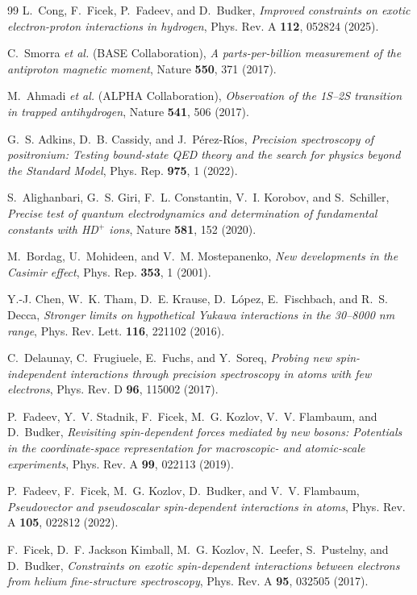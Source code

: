 \documentclass[
  aps,
  prd,
  reprint,
  amsmath,
  amssymb,
  nofootinbib,
  superscriptaddress,
  floatfix
]{revtex4-2}
\begin{document}
\begin{thebibliography}{99}
L.~Cong, F.~Ficek, P.~Fadeev, and D.~Budker,
\textit{Improved constraints on exotic electron-proton interactions in
hydrogen},
Phys. Rev. A \textbf{112}, 052824 (2025).

C.~Smorra \textit{et al.} (BASE Collaboration),
\textit{A parts-per-billion measurement of the antiproton magnetic
moment},
Nature \textbf{550}, 371 (2017).

M.~Ahmadi \textit{et al.} (ALPHA Collaboration),
\textit{Observation of the 1S--2S transition in trapped antihydrogen},
Nature \textbf{541}, 506 (2017).

G.~S. Adkins, D.~B. Cassidy, and J.~Pérez-Ríos,
\textit{Precision spectroscopy of positronium: Testing bound-state QED
theory and the search for physics beyond the Standard Model},
Phys. Rep. \textbf{975}, 1 (2022).

S.~Alighanbari, G.~S. Giri, F.~L. Constantin, V.~I. Korobov, and
S.~Schiller,
\textit{Precise test of quantum electrodynamics and determination of
fundamental constants with HD$^+$ ions},
Nature \textbf{581}, 152 (2020).

M.~Bordag, U.~Mohideen, and V.~M. Mostepanenko,
\textit{New developments in the Casimir effect},
Phys. Rep. \textbf{353}, 1 (2001).

Y.-J. Chen, W.~K. Tham, D.~E. Krause, D.~López, E.~Fischbach, and
R.~S. Decca,
\textit{Stronger limits on hypothetical Yukawa interactions in the
30--8000 nm range},
Phys. Rev. Lett. \textbf{116}, 221102 (2016).

C.~Delaunay, C.~Frugiuele, E.~Fuchs, and Y.~Soreq,
\textit{Probing new spin-independent interactions through precision
spectroscopy in atoms with few electrons},
Phys. Rev. D \textbf{96}, 115002 (2017).

P.~Fadeev, Y.~V. Stadnik, F.~Ficek, M.~G. Kozlov, V.~V. Flambaum, and
D.~Budker,
\textit{Revisiting spin-dependent forces mediated by new bosons:
Potentials in the coordinate-space representation for macroscopic- and
atomic-scale experiments},
Phys. Rev. A \textbf{99}, 022113 (2019).

P.~Fadeev, F.~Ficek, M.~G. Kozlov, D.~Budker, and V.~V. Flambaum,
\textit{Pseudovector and pseudoscalar spin-dependent interactions in
atoms},
Phys. Rev. A \textbf{105}, 022812 (2022).

F.~Ficek, D.~F. Jackson Kimball, M.~G. Kozlov, N.~Leefer, S.~Pustelny,
and D.~Budker,
\textit{Constraints on exotic spin-dependent interactions between
electrons from helium fine-structure spectroscopy},
Phys. Rev. A \textbf{95}, 032505 (2017).


\end{thebibliography}
\end{document}
